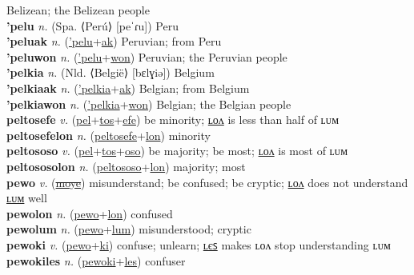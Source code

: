 Belizean; the Belizean people \label{'peliswon} \\
\textbf{'pelu} \textit{n.} (Spa. ⟨Perú⟩ [peˈɾu])
Peru \label{'pelu} \\
\textbf{'peluak} \textit{n.} (\hyperref['pelu]{'pelu}+\hyperref[ak]{ak})
Peruvian; from Peru \label{'peluak} \\
\textbf{'peluwon} \textit{n.} (\hyperref['pelu]{'pelu}+\hyperref[won]{won})
Peruvian; the Peruvian people \label{'peluwon} \\
\textbf{'pelkia} \textit{n.} (Nld. ⟨België⟩ [bɛlɣiə])
Belgium \label{'pelkia} \\
\textbf{'pelkiaak} \textit{n.} (\hyperref['pelkia]{'pelkia}+\hyperref[ak]{ak})
Belgian; from Belgium \label{'pelkiaak} \\
\textbf{'pelkiawon} \textit{n.} (\hyperref['pelkia]{'pelkia}+\hyperref[won]{won})
Belgian; the Belgian people \label{'pelkiawon} \\
\textbf{peltosefe} \textit{v.} (\hyperref[pel]{pel}+\hyperref[tos]{tos}+\hyperref[efe]{efe})
be minority; \hyperref[peltosefelon]{ʟᴏᴧ} is less than half of ʟᴜᴍ \label{peltosefe} \\
\textbf{peltosefelon} \textit{n.} (\hyperref[peltosefe]{peltosefe}+\hyperref[lon]{lon})
minority \label{peltosefelon} \\
\textbf{peltososo} \textit{v.} (\hyperref[pel]{pel}+\hyperref[tos]{tos}+\hyperref[oso]{oso})
be majority; be most; \hyperref[peltososolon]{ʟᴏᴧ} is most of ʟᴜᴍ \label{peltososo} \\
\textbf{peltososolon} \textit{n.} (\hyperref[peltososo]{peltososo}+\hyperref[lon]{lon})
majority; most \label{peltososolon} \\
\textbf{pewo} \textit{v.} (\hyperref[moye]{\sout{moye}})
misunderstand; be confused; be cryptic; \hyperref[pewolon]{ʟᴏᴧ} does not understand \hyperref[pewolum]{ʟᴜᴍ} well \label{pewo} \\
\textbf{pewolon} \textit{n.} (\hyperref[pewo]{pewo}+\hyperref[lon]{lon})
confused \label{pewolon} \\
\textbf{pewolum} \textit{n.} (\hyperref[pewo]{pewo}+\hyperref[lum]{lum})
misunderstood; cryptic \label{pewolum} \\
\textbf{pewoki} \textit{v.} (\hyperref[pewo]{pewo}+\hyperref[ki]{ki})
confuse; unlearn; \hyperref[pewokiles]{ʟєꜱ} makes ʟᴏᴧ stop understanding ʟᴜᴍ \label{pewoki} \\
\textbf{pewokiles} \textit{n.} (\hyperref[pewoki]{pewoki}+\hyperref[les]{les})
confuser \label{pewokiles} \\
